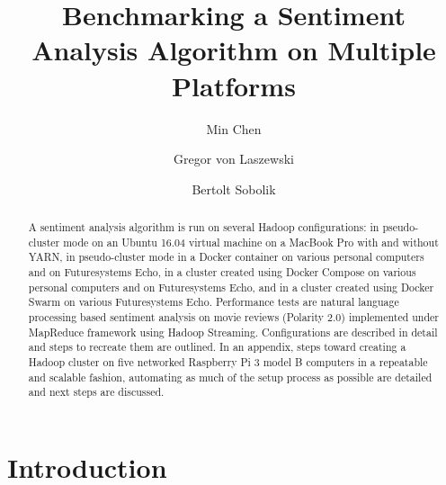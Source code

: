 \title{Benchmarking a Sentiment Analysis Algorithm on Multiple Platforms}


\author{Min Chen}

\author{Gregor von Laszewski}

\author{Bertolt Sobolik}


\renewcommand{\shortauthors}{M. Chen, G. v. Laszewski, B. Sobolik}


\begin{abstract}
A sentiment analysis algorithm is run on several Hadoop
configurations: in pseudo-cluster mode on an Ubuntu 16.04 virtual
machine on a MacBook Pro with and without YARN, in pseudo-cluster mode
in a Docker container on various personal computers and on
Futuresystems Echo, in a cluster created using Docker Compose on
various personal computers and on Futuresystems Echo, and in a cluster
created using Docker Swarm on various Futuresystems Echo. Performance
tests are natural language processing based sentiment analysis on
movie reviews (Polarity 2.0) implemented under MapReduce framework
using Hadoop Streaming. Configurations are described in detail and
steps to recreate them are outlined. In an appendix, steps toward
creating a Hadoop cluster on five networked Raspberry Pi 3 model B
computers in a repeatable and scalable fashion, automating as much of
the setup process as possible are detailed and next steps are
discussed.
\end{abstract}



\maketitle

\section{Introduction}\label{s:intro}


